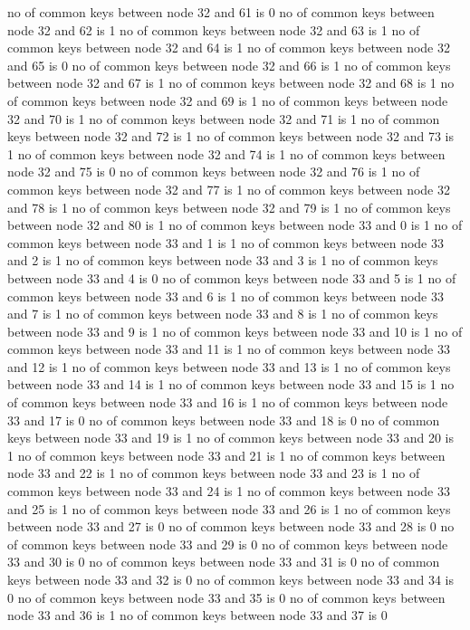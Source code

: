 no of common keys between node 32 and 61 is 0
no of common keys between node 32 and 62 is 1
no of common keys between node 32 and 63 is 1
no of common keys between node 32 and 64 is 1
no of common keys between node 32 and 65 is 0
no of common keys between node 32 and 66 is 1
no of common keys between node 32 and 67 is 1
no of common keys between node 32 and 68 is 1
no of common keys between node 32 and 69 is 1
no of common keys between node 32 and 70 is 1
no of common keys between node 32 and 71 is 1
no of common keys between node 32 and 72 is 1
no of common keys between node 32 and 73 is 1
no of common keys between node 32 and 74 is 1
no of common keys between node 32 and 75 is 0
no of common keys between node 32 and 76 is 1
no of common keys between node 32 and 77 is 1
no of common keys between node 32 and 78 is 1
no of common keys between node 32 and 79 is 1
no of common keys between node 32 and 80 is 1
no of common keys between node 33 and 0 is 1
no of common keys between node 33 and 1 is 1
no of common keys between node 33 and 2 is 1
no of common keys between node 33 and 3 is 1
no of common keys between node 33 and 4 is 0
no of common keys between node 33 and 5 is 1
no of common keys between node 33 and 6 is 1
no of common keys between node 33 and 7 is 1
no of common keys between node 33 and 8 is 1
no of common keys between node 33 and 9 is 1
no of common keys between node 33 and 10 is 1
no of common keys between node 33 and 11 is 1
no of common keys between node 33 and 12 is 1
no of common keys between node 33 and 13 is 1
no of common keys between node 33 and 14 is 1
no of common keys between node 33 and 15 is 1
no of common keys between node 33 and 16 is 1
no of common keys between node 33 and 17 is 0
no of common keys between node 33 and 18 is 0
no of common keys between node 33 and 19 is 1
no of common keys between node 33 and 20 is 1
no of common keys between node 33 and 21 is 1
no of common keys between node 33 and 22 is 1
no of common keys between node 33 and 23 is 1
no of common keys between node 33 and 24 is 1
no of common keys between node 33 and 25 is 1
no of common keys between node 33 and 26 is 1
no of common keys between node 33 and 27 is 0
no of common keys between node 33 and 28 is 0
no of common keys between node 33 and 29 is 0
no of common keys between node 33 and 30 is 0
no of common keys between node 33 and 31 is 0
no of common keys between node 33 and 32 is 0
no of common keys between node 33 and 34 is 0
no of common keys between node 33 and 35 is 0
no of common keys between node 33 and 36 is 1
no of common keys between node 33 and 37 is 0
